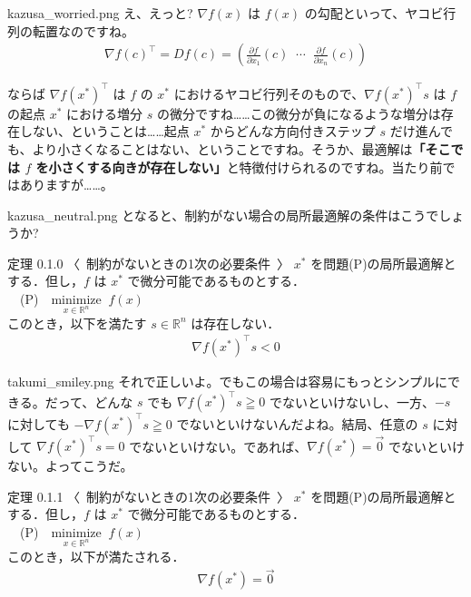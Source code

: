 \documentclass[b5paper,xelatex,ja=standard,10pt]{bxjsarticle}
\begin{document}
\begin{SERIFU}[colback=PaleIris, colbacktitle=PaleIris2]{kazusa_worried.png}
え、えっと? $\nabla f(x)$ は $f(x)$ の勾配といって、ヤコビ行列の転置なのですね。
\begin{eqnarray*}
\nabla f(c)^\top = Df(c) = \displaystyle \left( \frac{\partial f}{\partial x_1}(c) \;\; \cdots \;\; \frac{\partial f}{\partial x_n}(c) \right)
\end{eqnarray*}

ならば $\nabla f(x^\ast)^\top$ は $f$ の $x^\ast$ におけるヤコビ行列そのもので、$\nabla f(x^\ast)^\top s$ は $f$ の起点 $x^\ast$ における増分 $s$ の微分ですね……この微分が負になるような増分は存在しない、ということは……起点 $x^\ast$ からどんな方向付きステップ $s$ だけ進んでも、より小さくなることはない、ということですね。そうか、最適解は\textbf{「そこでは $f$ を小さくする向きが存在しない」}と特徴付けられるのですね。当たり前ではありますが……。
\end{SERIFU}

\begin{SERIFU}[colback=PaleIris, colbacktitle=PaleIris2]{kazusa_neutral.png}
となると、制約がない場合の局所最適解の条件はこうでしょうか?
\end{SERIFU}

\begin{PROP}[colback=White]{定理 0.1.0 〈\, 制約がないときの1次の必要条件 \,〉}
$x^\ast$ を問題(P)の局所最適解とする．但し，$f$ は $x^\ast$ で微分可能であるものとする．
\\[5pt]
　(P)　$\displaystyle \underset{x \in \mathbb{R}^n}{\mathrm{minimize}} \; \; f(x)$
\\[5pt]
このとき，以下を満たす $s \in \mathbb{R}^n$ は存在しない．
\begin{eqnarray*}
\nabla f(x^\ast)^\top s < 0
\end{eqnarray*}
\end{PROP}

\begin{SERIFU}[colback=PaleGold, colbacktitle=PaleGold2]{takumi_smiley.png}
それで正しいよ。でもこの場合は容易にもっとシンプルにできる。だって、どんな $s$ でも $\nabla f(x^\ast)^\top s \geqq 0$ でないといけないし、一方、$-s$ に対しても $-\nabla f(x^\ast)^\top s \geqq 0$ でないといけないんだよね。結局、任意の $s$ に対して $\nabla f(x^\ast)^\top s = 0$ でないといけない。であれば、$\nabla f(x^\ast) = \vec{0}$ でないといけない。よってこうだ。
\end{SERIFU}

\begin{PROP}[colback=White]{定理 0.1.1 〈\, 制約がないときの1次の必要条件 \,〉}
$x^\ast$ を問題(P)の局所最適解とする．但し，$f$ は $x^\ast$ で微分可能であるものとする．
\\[5pt]
　(P)　$\displaystyle \underset{x \in \mathbb{R}^n}{\mathrm{minimize}} \; \; f(x)$
\\[5pt]
このとき，以下が満たされる．
\begin{eqnarray*}
\nabla f (x^\ast) = \vec{0}
\end{eqnarray*}
\end{PROP}
\end{document}
